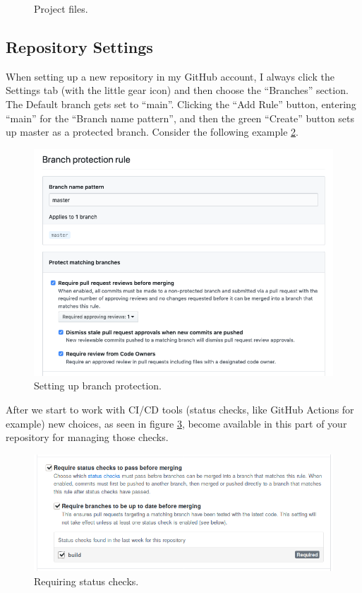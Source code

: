 \begin{figure}[!htb]
\centering

\caption{Project files.}
\label{projfiles}
\end{figure}


\subsection{Repository Settings}

\justify{}
When setting up a new repository in my GitHub account, I always click the Settings tab (with the little gear icon) and then choose the
``Branches'' section. The Default branch gets set to ``main''. Clicking the ``Add Rule'' button, entering ``main'' for the ``Branch name pattern'',
and then the green ``Create'' button sets up master as a protected branch. Consider the following example \ref{branchprotect}.

\begin{figure}[!htb]
\centering
\includegraphics[scale=0.50]{images/github-branch-protection.png}
\caption{Setting up branch protection.}
\label{branchprotect}
\end{figure}

\justify{}
After we start to work with CI/CD tools (status checks, like GitHub Actions for example) new choices, as seen in figure \ref{statuscheck}, become
available in this part of your repository for managing those checks.

\begin{figure}
\centering
\includegraphics[scale=0.53]{images/guthub-status-check.png}
\caption{Requiring status checks.}
\label{statuscheck}
\end{figure}

